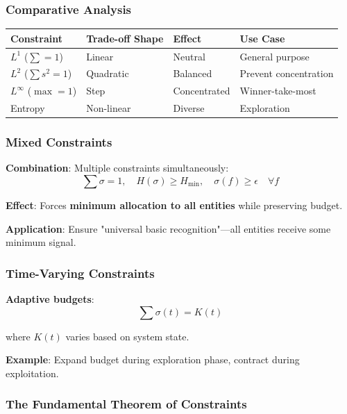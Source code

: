 \documentclass[11pt,a4paper]{article}
\theoremstyle{definition}
\theoremstyle{remark}
\begin{document}
\subsubsection{Comparative Analysis}

\begin{center}
\begin{tabular}{llll}
\toprule
\textbf{Constraint} & \textbf{Trade-off Shape} & \textbf{Effect} & \textbf{Use Case} \\
\midrule
$L^1$ ($\sum = 1$) & Linear & Neutral & General purpose \\
$L^2$ ($\sum s^2 = 1$) & Quadratic & Balanced & Prevent concentration \\
$L^\infty$ ($\max = 1$) & Step & Concentrated & Winner-take-most \\
Entropy & Non-linear & Diverse & Exploration \\
\bottomrule
\end{tabular}
\end{center}

\subsubsection{Mixed Constraints}

\textbf{Combination}: Multiple constraints simultaneously:
\[ \sum \sigma = 1, \quad H(\sigma) \ge H_{\min}, \quad \sigma(f) \ge \epsilon \quad \forall f \]

\textbf{Effect}: Forces \textbf{minimum allocation to all entities} while preserving budget.

\textbf{Application}: Ensure "universal basic recognition"---all entities receive some minimum signal.

\subsubsection{Time-Varying Constraints}

\textbf{Adaptive budgets}:
\[ \sum \sigma(t) = K(t) \]

where $K(t)$ varies based on system state.

\textbf{Example}: Expand budget during exploration phase, contract during exploitation.

\subsubsection{The Fundamental Theorem of Constraints}
\end{document}
